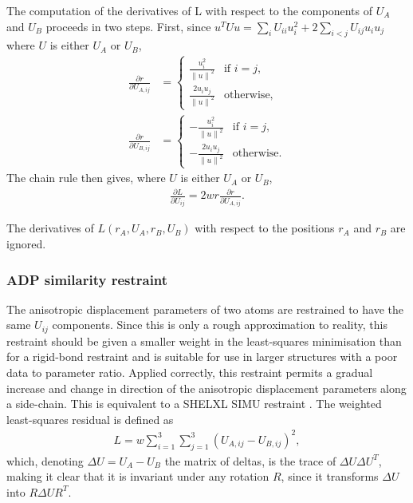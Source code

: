 \documentclass[11pt]{article}
\newcommand{\norm}[1]{\left\| #1 \right\|}
\newcommand{\partialder}[2]{\frac{\partial #1}{\partial #2}}
\begin{document}
The computation of the derivatives of L with respect to the components of $U_A$ and $U_B$ proceeds in two steps. First, since $u^T U u = \sum_i U_{ii} u_i^2 + 2\sum_{i<j} U_{ij}u_i u_j$ where $U$ is either $U_A$ or $U_B$, 
\begin{align}
\partialder{r}{U_{A,ij}} &= \begin{cases}
 \displaystyle \frac{u_i^2}{\norm{u}^2} & \text{if $i=j$,}\\[1em]
 \displaystyle \frac{2u_i u_j}{\norm{u}^2} & \text{otherwise,}
 \end{cases}\\
\partialder{r}{U_{B,ij}} &= \begin{cases}
 \displaystyle -\frac{u_i^2}{\norm{u}^2} & \text{if $i=j$,}\\[1em]
 \displaystyle -\frac{2u_i u_j}{\norm{u}^2} & \text{otherwise.}
 \end{cases}
\end{align}
The chain rule then gives, where $U$ is either $U_A$ or $U_B$,
\begin{align}
\partialder{L}{U_{ij}} = 2wr \partialder{r}{U_{A,ij}}.
\end{align}

The derivatives of $L(r_A, U_A, r_B, U_B)$ with respect to the positions $r_A$ and $r_B$ are ignored.

\subsubsection{ADP similarity restraint}
\label{ADP:similarity}
The anisotropic displacement parameters of two atoms are restrained to have the same $U_{ij}$ components. Since this is only a rough approximation to reality, this restraint should be given a smaller weight in the least-squares minimisation than for a rigid-bond restraint and is suitable for use in larger structures with a poor data to parameter ratio. Applied correctly, this restraint permits a gradual increase and change in direction of the anisotropic displacement parameters along a side-chain. This is equivalent to a SHELXL SIMU restraint \cite{Sheldrick:1997aa}.
The weighted least-squares residual is defined as
\begin{align}
\label{eqn:ADP:restraints:similarity}
L = w \sum_{i=1}^3 \sum_{j=1}^3 (U_{A,ij} - U_{B,ij})^2,
\end{align}
which, denoting $\Delta U=U_A - U_B$ the matrix of deltas, is the trace of $\Delta U \Delta U^T$, making it clear that it is invariant under any rotation $R$, since it transforms $\Delta U$ into $R\Delta U R^T$.
\end{document}
